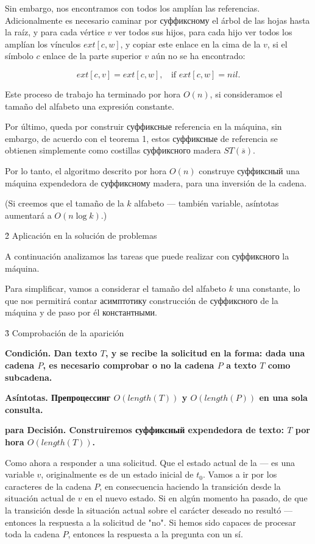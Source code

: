 Sin embargo, nos encontramos con todos los amplían las referencias. Adicionalmente es necesario caminar por суффиксному el árbol de las hojas hasta la raíz, y para cada vértice $v$ ver todos sus hijos, para cada hijo ver todos los amplían los vínculos $ext[c,w]$, y copiar este enlace en la cima de la $v$, si el símbolo $c$ enlace de la parte superior $v$ aún no se ha encontrado:

$$ ext[c,v] = ext[c,w], ~~~~ \text{if $ext[c,w] = nil$.} $$

Este proceso de trabajo ha terminado por hora $O (n)$, si consideramos el tamaño del alfabeto una expresión constante.

Por último, queda por construir суффиксные referencia en la máquina, sin embargo, de acuerdo con el teorema 1, estos суффиксные de referencia se obtienen simplemente como costillas суффиксного madera $ST(\overline{s})$.

Por lo tanto, el algoritmo descrito por hora $O(n)$ construye суффиксный una máquina expendedora de суффиксному madera, para una inversión de la cadena.

(Si creemos que el tamaño de la $k$ alfabeto --- también variable, asíntotas aumentará a $O (n \log k)$.)



\h2{ Aplicación en la solución de problemas }

A continuación analizamos las tareas que puede realizar con суффиксного la máquina.

Para simplificar, vamos a considerar el tamaño del alfabeto $k$ una constante, lo que nos permitirá contar асимптотику construcción de суффиксного de la máquina y de paso por él константными.


\h3{ Comprobación de la aparición }

\bf{Condición}. Dan texto $T$, y se recibe la solicitud en la forma: dada una cadena $P$, es necesario comprobar o no la cadena $P$ a texto $T$ como subcadena.

\bf{Asíntotas}. Препроцессинг $O (length (T))$ y $O (length (P))$ en una sola consulta.

\bf{para Decisión}. Construiremos суффиксный expendedora de texto: $T$ por hora $O (length (T))$.

Como ahora a responder a una solicitud. Que el estado actual de la --- es una variable $v$, originalmente es de un estado inicial de $t_0$. Vamos a ir por los caracteres de la cadena $P$, en consecuencia haciendo la transición desde la situación actual de $v$ en el nuevo estado. Si en algún momento ha pasado, de que la transición desde la situación actual sobre el carácter deseado no resultó --- entonces la respuesta a la solicitud de "no". Si hemos sido capaces de procesar toda la cadena $P$, entonces la respuesta a la pregunta con un sí.

